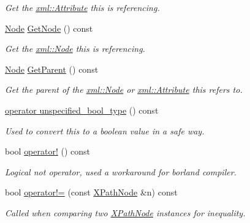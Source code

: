\begin{DoxyCompactItemize}
\begin{DoxyCompactList}\small\item\em Get the \hyperlink{classMezzanine_1_1xml_1_1Attribute}{xml::Attribute} this is referencing. \item\end{DoxyCompactList}\item 
\hyperlink{classMezzanine_1_1xml_1_1Node}{Node} \hyperlink{classMezzanine_1_1xml_1_1XPathNode_a3f4d8aac2c941a30d8e4b230fc17eddb}{GetNode} () const 
\begin{DoxyCompactList}\small\item\em Get the \hyperlink{classMezzanine_1_1xml_1_1Node}{xml::Node} this is referencing. \item\end{DoxyCompactList}\item 
\hyperlink{classMezzanine_1_1xml_1_1Node}{Node} \hyperlink{classMezzanine_1_1xml_1_1XPathNode_a62bf7ad43204f9ed8805bab559a922e8}{GetParent} () const 
\begin{DoxyCompactList}\small\item\em Get the parent of the \hyperlink{classMezzanine_1_1xml_1_1Node}{xml::Node} or \hyperlink{classMezzanine_1_1xml_1_1Attribute}{xml::Attribute} this refers to. \item\end{DoxyCompactList}\item 
\hyperlink{classMezzanine_1_1xml_1_1XPathNode_a2990195cf4c7163c80b40914574e745c}{operator unspecified\_\-bool\_\-type} () const 
\begin{DoxyCompactList}\small\item\em Used to convert this to a boolean value in a safe way. \item\end{DoxyCompactList}\item 
bool \hyperlink{classMezzanine_1_1xml_1_1XPathNode_afc075c0837405d889e465be501508f29}{operator!} () const 
\begin{DoxyCompactList}\small\item\em Logical not operator, used a workaround for borland compiler. \item\end{DoxyCompactList}\item 
bool \hyperlink{classMezzanine_1_1xml_1_1XPathNode_ae0ee1b5c42ce8445b4a8f2da96b77ea4}{operator!=} (const \hyperlink{classMezzanine_1_1xml_1_1XPathNode}{XPathNode} \&n) const 
\begin{DoxyCompactList}\small\item\em Called when comparing two \hyperlink{classMezzanine_1_1xml_1_1XPathNode}{XPathNode} instances for inequality. \item\end{DoxyCompactList}\item 

\end{DoxyCompactItemize}
